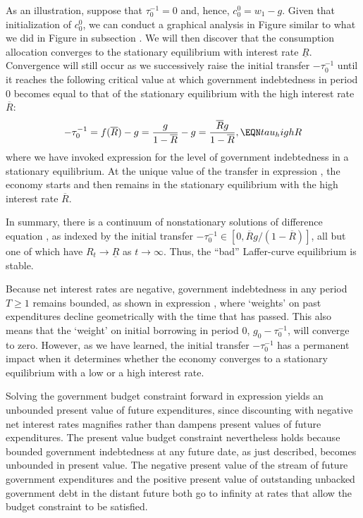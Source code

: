 As an illustration, suppose that $\tau^{-1}_0=0$ and,
hence, $c^0_0 = w_1 -g$. Given that initialization 
of $c^0_0$, we can conduct a graphical analysis
in Figure  similar to what we did
in Figure  
in subsection . We will then
discover that the consumption allocation converges 
to the stationary equilibrium with interest rate 
$\underline R$. Convergence will still occur as we
successively raise the initial transfer $- \tau^{-1}_0$
until it reaches the following critical value at which 
government indebtedness in period $0$ becomes equal 
to that of the stationary equilibrium with the high 
interest rate $\overline R$:
$$ - \tau^{-1}_0 =  f(\overline R) - g 
           =  {g \over 1-\overline R} -g
           = {\overline R g \over 1- \overline R},    \EQN tau_highR
$$
where we have invoked expression 
for the level of government indebtedness in
a stationary equilibrium. At the unique value of the
transfer in expression , the economy
starts and then remains in the stationary
equilibrium with the high interest rate $\overline R$. 


In summary, there is a continuum of nonstationary solutions
of  difference equation , as indexed by the
initial transfer 
$- \tau^{-1}_0 \in [0, \overline R g /(1- \overline R)]$, 
all but one of which  have
$R_t \rightarrow \underline R$ as $t \rightarrow \infty$.  
Thus, the ``bad'' Laffer-curve equilibrium is stable.

Because net interest rates are negative, government indebtedness
in any period $T\geq 1$ remains bounded, as shown in expression , 
where `weights' on past expenditures decline 
geometrically with the time that has passed. This also means 
that the `weight' on initial borrowing in period $0$, 
$g_0-\tau^{-1}_0$, will converge to zero. However,
as we have learned, the initial 
transfer $-\tau^{-1}_0$ has a permanent impact when it determines whether
the economy converges to a stationary
equilibrium with a low or a high interest rate.

Solving the government budget constraint
forward in expression  yields an
unbounded present value of future expenditures,
since discounting with negative net interest rates magnifies
rather than dampens present values of future expenditures.
The present value budget constraint nevertheless holds because
bounded government indebtedness at any future
date, as just described, becomes unbounded in
present value. The negative present value
of the stream of future government expenditures
and the positive present value of outstanding unbacked 
government debt in the distant future both go to infinity 
at rates that allow the budget constraint to be satisfied.



